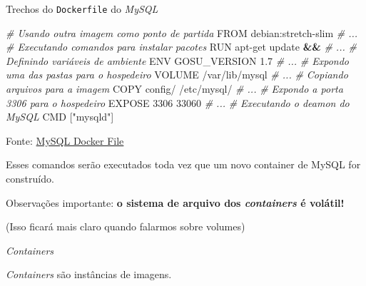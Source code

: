 \documentclass[
  ignorenonframetext,
]{beamer}
\newenvironment{Shaded}{\begin{snugshade}}{\end{snugshade}}
\newcommand{\CommentTok}[1]{\textcolor[rgb]{0.56,0.35,0.01}{\textit{#1}}}
\newcommand{\ExtensionTok}[1]{#1}
\newcommand{\KeywordTok}[1]{\textcolor[rgb]{0.13,0.29,0.53}{\textbf{#1}}}
\newcommand{\NormalTok}[1]{#1}
\newcommand{\StringTok}[1]{\textcolor[rgb]{0.31,0.60,0.02}{#1}}
\begin{document}
\begin{frame}[fragile]

Trechos do \texttt{Dockerfile} do \emph{MySQL}

\end{frame}

\begin{frame}[fragile]

\begin{Shaded}
\begin{Highlighting}[]
\CommentTok{# Usando outra imagem como ponto de partida}
\ExtensionTok{FROM}\NormalTok{ debian:stretch-slim }\CommentTok{# ...}
\CommentTok{# Executando comandos para instalar pacotes}
\ExtensionTok{RUN}\NormalTok{ apt-get update }\KeywordTok{&&} \CommentTok{# ...}
\CommentTok{# Definindo variáveis de ambiente}
\ExtensionTok{ENV}\NormalTok{ GOSU_VERSION 1.7 }\CommentTok{# ...}
\CommentTok{# Expondo uma das pastas para o hospedeiro}
\ExtensionTok{VOLUME}\NormalTok{ /var/lib/mysql }\CommentTok{# ...}
\CommentTok{# Copiando arquivos para a imagem}
\ExtensionTok{COPY}\NormalTok{ config/ /etc/mysql/ }\CommentTok{# ...}
\CommentTok{# Expondo a porta 3306 para o hospedeiro}
\ExtensionTok{EXPOSE}\NormalTok{ 3306 33060 }\CommentTok{# ...}
\CommentTok{# Executando o deamon do MySQL}
\ExtensionTok{CMD}\NormalTok{ [}\StringTok{"mysqld"}\NormalTok{]}
\end{Highlighting}
\end{Shaded}

Fonte:
\href{https://github.com/docker-library/mysql/blob/a7a737f1eb44db467c85c8229df9d886dd63460e/8.0/Dockerfile}{MySQL
Docker File}

\end{frame}

\begin{frame}

Esses comandos serão executados toda vez que um novo container de MySQL
for construído.

\end{frame}

\begin{frame}

Observações importante: \textbf{o sistema de arquivo dos
\emph{containers} é volátil!}

(Isso ficará mais claro quando falarmos sobre volumes)

\end{frame}

\begin{frame}{\emph{Containers}}
\protect\hypertarget{containers}{}

\emph{Containers} são instâncias de imagens.

\end{frame}
\end{document}
